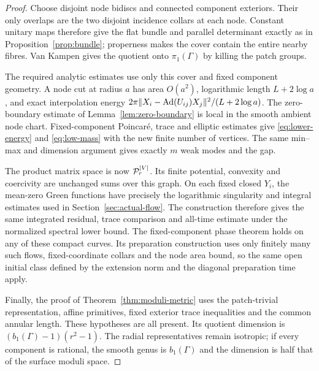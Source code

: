 \begin{proof}
Choose disjoint node bidiscs and connected component
exteriors. Their only overlaps are the two disjoint
incidence collars at each node. Constant unitary
maps therefore give the flat bundle and parallel
determinant exactly as in
Proposition~\ref{prop:bundle}; properness makes
the cover contain the entire nearby fibres.
Van Kampen gives the quotient onto $\pi_1(\Gamma)$
by killing the patch groups.

The required analytic estimates use only this
cover and fixed component geometry. A node cut
at radius $a$ has area $O(a^2)$, logarithmic
length $L+2\log a$, and exact interpolation
energy $2\pi\|X_i-\operatorname{Ad}(U_{ij})X_j\|^2/(L+2\log a)$.
The zero-boundary estimate of
Lemma~\ref{lem:zero-boundary} is local in the
smooth ambient node chart. Fixed-component
Poincaré, trace and elliptic estimates give
\eqref{eq:lower-energy} and \eqref{eq:low-mass}
with the new finite number of vertices.
The same min--max and dimension argument
gives exactly $m$ weak modes and the gap.

The product matrix space is now $\mathcal P_r^{|V|}$.
Its finite potential, convexity and coercivity
are unchanged sums over this graph. On each
fixed closed $Y_i$, the mean-zero Green functions
have precisely the logarithmic singularity and
integral estimates used in
Section~\ref{sec:actual-flow}. The construction
therefore gives the same integrated residual,
trace comparison and all-time estimate under
the normalized spectral lower bound.
The fixed-component phase theorem holds on any
of these compact curves. Its preparation
construction uses only finitely many such flows,
fixed-coordinate collars and the node area
bound, so the same open initial class defined
by the extension norm and the
diagonal preparation time apply.

Finally, the proof of
Theorem~\ref{thm:moduli-metric} uses the
patch-trivial representation, affine
primitives, fixed exterior trace inequalities
and the common annular length. These hypotheses
are all present. Its quotient dimension is
$(b_1(\Gamma)-1)(r^2-1)$.
The radial representatives remain isotropic;
if every component is rational, the smooth
genus is $b_1(\Gamma)$ and the dimension is
half that of the surface moduli space.
\end{proof}

